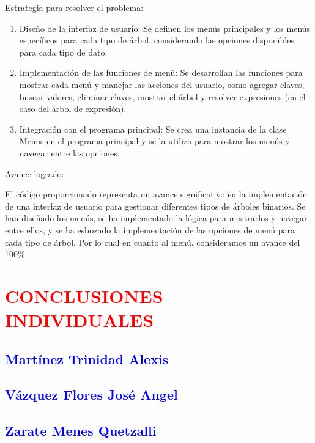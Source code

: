 \documentclass[12pt]{article}
\begin{document}
Estrategia para resolver el problema:
\begin{enumerate}
    \item Diseño de la interfaz de usuario: Se definen los menús principales y los menús específicos para cada tipo de árbol, considerando las opciones disponibles para cada tipo de dato.
    \item Implementación de las funciones de menú: Se desarrollan las funciones para mostrar cada menú y manejar las acciones del usuario, como agregar claves, buscar valores, eliminar claves, mostrar el árbol y resolver expresiones (en el caso del árbol de expresión).
    \item Integración con el programa principal: Se crea una instancia de la clase Menus en el programa principal y se la utiliza para mostrar los menús y navegar entre las opciones.
\end{enumerate}


Avance logrado:
\par\vspace{0cm}
El código proporcionado representa un avance significativo en la implementación de una interfaz de usuario para gestionar diferentes tipos de árboles binarios. Se han diseñado los menús, se ha implementado la lógica para mostrarlos y navegar entre ellos, y se ha esbozado la implementación de las opciones de menú para cada tipo de árbol. Por lo cual en cuanto al menú, consideramos un avance del 100\%.













\subsection*{\textcolor{blue}{  }}

\subsection*{\textcolor{blue}{  }}





\section*{\textcolor{red}{\textbf{CONCLUSIONES INDIVIDUALES}}}

\subsection*{\textcolor{blue}{Martínez Trinidad Alexis}}



\subsection*{\textcolor{blue}{Vázquez Flores José Angel}}



\subsection*{\textcolor{blue}{Zarate Menes Quetzalli}}
\end{document}
